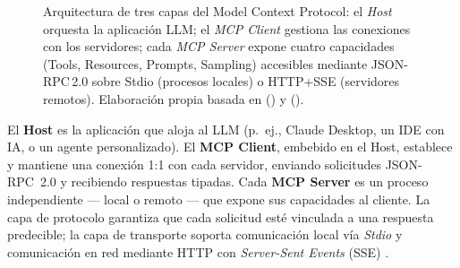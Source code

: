 \begin{figure}[H]
\caption[Arquitectura de tres capas del MCP \citep{ray2025survey, ehtesham2025survey}.]{Arquitectura de tres capas del Model Context Protocol: el \textit{Host} orquesta la aplicación LLM; el \textit{MCP Client} gestiona las conexiones con los servidores; cada \textit{MCP Server} expone cuatro capacidades (Tools, Resources, Prompts, Sampling) accesibles mediante JSON-RPC\,2.0 sobre Stdio (procesos locales) o HTTP+SSE (servidores remotos). Elaboración propia basada en \protect\citeauthor{ray2025survey} (\protect\citeyear{ray2025survey}) y \protect\citeauthor{ehtesham2025survey} (\protect\citeyear{ehtesham2025survey}).}
\label{fig:mcp_arch}
\end{figure}

El \textbf{Host} es la aplicación que aloja al LLM (p.~ej., Claude Desktop, un IDE con IA, o un agente personalizado). El \textbf{MCP Client}, embebido en el Host, establece y mantiene una conexión 1:1 con cada servidor, enviando solicitudes JSON-RPC~2.0 y recibiendo respuestas tipadas. Cada \textbf{MCP Server} es un proceso independiente --- local o remoto --- que expone sus capacidades al cliente. La capa de protocolo garantiza que cada solicitud esté vinculada a una respuesta predecible; la capa de transporte soporta comunicación local vía \textit{Stdio} y comunicación en red mediante HTTP con \textit{Server-Sent Events} (SSE) \citep{ehtesham2025survey}.


